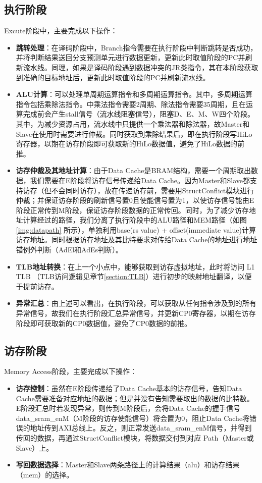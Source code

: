 \subsection{执行阶段}
Excute阶段中，主要完成以下操作：
\begin{itemize}
    \item \textbf{跳转处理}：在译码阶段中，Branch指令需要在执行阶段中判断跳转是否成功，并将判断结果送回分支预测单元进行数据更新，更新此时取值阶段的PC并刷新流水线。同理，如果是译码阶段遇到数据冲突的JR类指令，其在本阶段获取到准确的目标地址后，更新此时取值阶段的PC并刷新流水线。
    \item \textbf{ALU计算}：可以处理单周期运算指令和多周期运算指令。其中，多周期运算指令包括乘除法指令。\cpuname 中乘法指令需要2周期、除法指令需要35周期，且在运算完成前会产生stall信号（流水线阻塞信号），阻塞D、E、M、W四个阶段。其中，为减少资源占用，流水线中只提供一个乘法器和除法器，故Master和Slave在使用时需要进行仲裁。同时获取到乘除结果后，即在执行阶段写HiLo寄存器，以期在访存阶段即可获取新的HiLo数据值，避免了HiLo数据的前推。
    \item \textbf{访存仲裁及其地址计算}：由于Data Cache是BRAM结构，需要一个周期取出数据，我们需要在E阶段将访存信号传递给Data Cache。因为Master和Slave都支持访存（但不会同时访存），故在传递访存前，需要用StructConflict模块进行仲裁；并保证访存阶段的刷新信号置0且使能信号置为1，以使访存信号能由E阶段正常传到M阶段，保证访存阶段数据的正常传回。同时，为了减少访存地址计算经过的路径，我们分离了执行阶段中的ALU路径和MEM路径（如图 \ref{img:datapath} 所示），单独利用base(rs value) + offset(immediate value)计算访存地址。同时根据访存地址及其比特要求对传给Data Cache的地址进行地址错例外判断（AdEl和AdEs判断）。
    \item \textbf{TLB地址转换}：在上一个小点中，能够获取到访存虚拟地址，此时将访问 L1 TLB （TLB访问逻辑见章节\ref{section:TLB}）进行初步的映射地址翻译，以便于提前访存。
    \item \textbf{异常汇总}：由上述可以看出，在执行阶段，可以获取从任何指令涉及到的所有异常信号，故我们在执行阶段汇总异常信号，并更新CP0寄存器，以期在访存阶段即可获取新的CP0数据值，避免了CP0数据的前推。
\end{itemize}

\subsection{访存阶段}
Memory Access阶段，主要完成以下操作：

\begin{itemize}
    \item \textbf{访存控制}：虽然在E阶段传递给了Data Cache基本的访存信号，告知Data Cache需要准备对应地址的数据；但是并没有告知需要取出的数据的比特数。E阶段汇总时若发现异常，则传到M阶段后，会将Data Cache的握手信号data\_sram\_enM（M阶段的访存使能信号）将会置为0，阻止Data Cache将错误的地址传到AXI总线上。反之，则正常发送data\_sram\_enM信号，并得到传回的数据，再通过StructConflict模块，将数据交付到对应 Path（Master或Slave）上。
    \item \textbf{写回数据选择}：Master和Slave两条路径上的计算结果（alu）和访存结果（mem）的选择。
\end{itemize}

